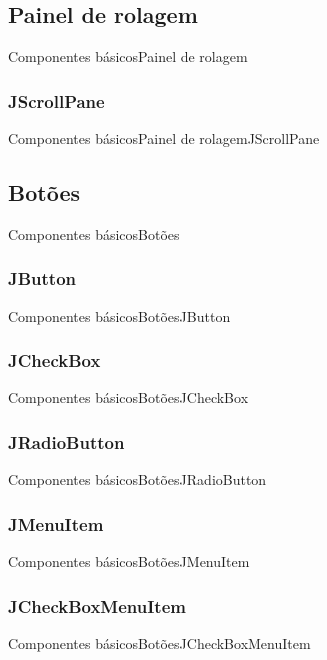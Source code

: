 \documentclass[10pt]{beamer}
\begin{document}
\subsection{Painel de rolagem}
\begin{frame}{Componentes básicos}{Painel de rolagem}
\end{frame}{}
\subsubsection{JScrollPane}
\begin{frame}{Componentes básicos}{Painel de rolagem}{JScrollPane}
\end{frame}{}
\subsection{Botões}
\begin{frame}{Componentes básicos}{Botões}
\end{frame}{}
\subsubsection{JButton}
\begin{frame}{Componentes básicos}{Botões}{JButton}
\end{frame}{}
\subsubsection{JCheckBox}
\begin{frame}{Componentes básicos}{Botões}{JCheckBox}
\end{frame}{}
\subsubsection{JRadioButton}
\begin{frame}{Componentes básicos}{Botões}{JRadioButton}
\end{frame}{}
\subsubsection{JMenuItem}
\begin{frame}{Componentes básicos}{Botões}{JMenuItem}
\end{frame}{}
\subsubsection{JCheckBoxMenuItem}
\begin{frame}{Componentes básicos}{Botões}{JCheckBoxMenuItem}
\end{frame}{}
\end{document}
